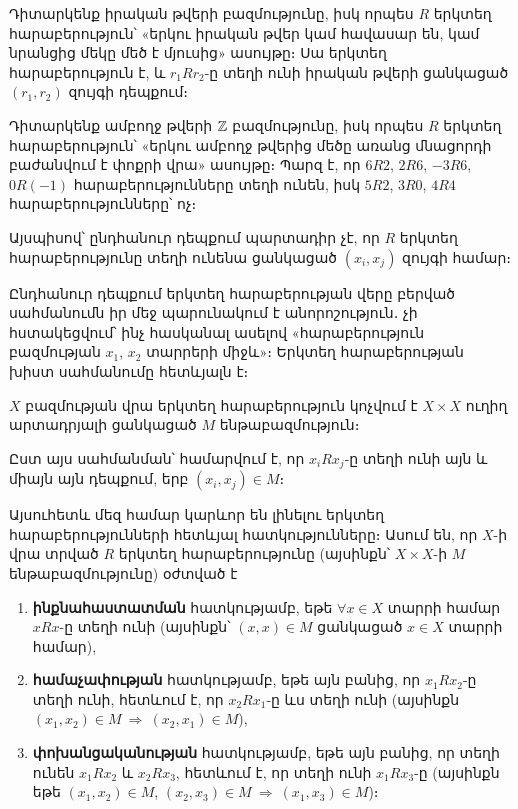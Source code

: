 \documentclass[./main.tex]{subfiles}
\begin{document}
\begin{example}\label{ch2ex6}  
Դիտարկենք իրական թվերի բազմությունը, իսկ որպես $R$ երկտեղ հարաբերություն՝ «երկու իրական թվեր կամ հավասար են, կամ նրանցից մեկը մեծ է մյուսից» ասույթը։ Սա երկտեղ հարաբերություն է, և $r_1Rr_2$-ը տեղի ունի իրական թվերի ցանկացած $(r_1,r_2)$ զույգի դեպքում։
\end{example}
\label{օրինակ 2:6}
\begin{example}\label{ch2ex7}  
Դիտարկենք ամբողջ թվերի $\mathbb{Z}$ բազմությունը, իսկ որպես $R$ երկտեղ հարաբերություն՝ «երկու ամբողջ թվերից մեծը առանց մնացորդի բաժանվում է փոքրի վրա» ասույթը։ Պարզ է, որ $6R2$, $2R6$, $-3R6$, $0R(-1)$ հարաբերությունները տեղի ունեն, իսկ $5R2$, $3R0$, $4R4$ հարաբերությունները՝ ոչ։
\end{example} %
\label{օրինակ 2:7}
\par Այսպիսով՝ ընդհանուր դեպքում պարտադիր չէ, որ $R$ երկտեղ հարաբերությունը տեղի ունենա ցանկացած $(x_i,x_j)$ զույգի համար։ 
\begin{note}
Ընդհանուր դեպքում երկտեղ հարա\-բե\-րու\-թյան վերը բերված \linebreak սահմանումն իր մեջ պարունակում է անորոշություն․ չի հստակեցվում՝ ինչ հաս\-կա\-նալ ասե\-լով «հարաբերություն բազմության $x_1$, $x_2$ տարրե\-րի միջև»։ Երկտեղ հարա\-բե\-րու\-թյան խիստ սահմանումը հետևյալն է։
\end{note}
\begin{definition}
  $X$ բազմության վրա երկտեղ հարաբերություն կոչվում է $X \times X$ ուղիղ արտադրյալի ցանկացած $M$ ենթաբազմություն։
\end{definition}
\par Ըստ այս սահմանման՝ համարվում է, որ $x_iRx_j$-ը տեղի ունի այն և միայն այն դեպքում, երբ $(x_i,x_j) \in M$։
\par Այսուհետև մեզ համար կարևոր են լինելու երկտեղ հարաբերությունների հետև\-յալ հատկությունները։ Ասում են, որ $X$-ի վրա տրված $R$ երկտեղ հարաբերությունը (այսինքն՝ $X\times X$-ի $M$ ենթաբազմությունը) օժտված է
\begin{enumerate}
    \item \textbf{ինքնահաստատման} հատկությամբ, եթե $\forall x \in X$ տարրի համար $xRx$-ը տեղի ունի (այսինքն՝ $(x,x)\in M$ ցանկացած $x\in X$ տարրի համար),
    \item \textbf{համաչափության} հատկությամբ, եթե այն բանից, որ $x_1Rx_2$-ը տեղի ունի, հետևում է, որ $x_2Rx_1$-ը ևս տեղի ունի (այսինքն $(x_1,x_2)\in M\ \Rightarrow \ (x_2,x_1)\in M$),
    \item \textbf{փոխանցականության} հատկությամբ, եթե այն բանից, որ տեղի ունեն $x_1Rx_2$ և $x_2Rx_3$, հետևում է, որ տեղի ունի $x_1Rx_3$-ը (այսինքն եթե $(x_1,x_2) \in M$, $(x_2,x_3) \in M \ \Rightarrow\ (x_1,x_3) \in M$)։
\end{enumerate}
\end{document}
